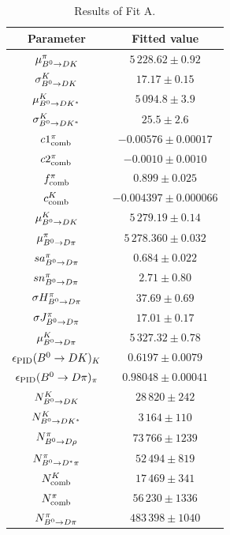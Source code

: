 \begin{table}
	\begin{center}
		\caption{Results of Fit A.}
		\begin{tabular}{cc}
			\toprule
			Parameter & Fitted value \\
			\hline
                        $\mu^{\pi}_{B^0\rightarrow DK}$ & $5\,228.62\pm0.92$ \\
                        $\sigma^{K}_{B^0\rightarrow DK}$ & $17.17\pm0.15$  \\
                        $\mu^{K}_{B^0\rightarrow DK^*}$ & $5\,094.8\pm3.9$  \\
                        $\sigma^{K}_{B^0\rightarrow DK^*}$ & $25.5\pm2.6$ \\
                        $c1^{\pi}_{\rm comb}$ & $-0.00576\pm0.00017$  \\
                        $c2^{\pi}_{\rm comb}$ & $-0.0010\pm0.0010$  \\
                        $f^{\pi}_{\rm comb}$ & $0.899\pm0.025$  \\
                        $c^{K}_{\rm comb}$ & $-0.004397\pm0.000066$  \\
                        $\mu^{K}_{B^0\rightarrow DK}$ & $5\,279.19\pm0.14$  \\
                        $\mu^{\pi}_{B^0\rightarrow D\pi}$ & $5\,278.360\pm0.032$  \\
                        $sa^{\pi}_{B^0\rightarrow D\pi}$ & $0.684\pm0.022$  \\
                        $sn^{\pi}_{B^0\rightarrow D\pi}$ & $2.71\pm0.80$  \\
                        $\sigma H^{\pi}_{B^0\rightarrow D\pi}$ & $37.69\pm0.69$ \\
                        $\sigma J^{\pi}_{B^0\rightarrow D\pi}$ & $17.01\pm0.17$  \\
                        $\mu^{K}_{B^0\rightarrow D\pi}$ & $5\,327.32\pm0.78$  \\
                        $\epsilon_{\rm PID}(B^0\rightarrow DK)_{K}$ & $0.6197\pm0.0079$  \\
                        $\epsilon_{\rm PID}(B^0\rightarrow D\pi)_{\pi}$ & $0.98048\pm0.00041$  \\
                        $N^{K}_{B^0\rightarrow DK}$ & $28\,820\pm242$ \\
                        $N^{K}_{B^0\rightarrow DK^*}$ & $3\,164\pm110$ \\
                        $N^{\pi}_{B^0\rightarrow D\rho}$ & $73\,766\pm1239$ \\
                        $N^{\pi}_{B^0\rightarrow D^*\pi}$ & $52\,494\pm819$ \\
                        $N^{K}_{\rm comb}$ & $17\,469\pm341$ \\
                        $N^{\pi}_{\rm comb}$ & $56\,230\pm1336$ \\
                        $N^{\pi}_{B^0\rightarrow D\pi}$ & $483\,398\pm1040$ \\
			\bottomrule
		\end{tabular}
		\label{tab:FitAfloating}
	\end{center}
\end{table}

